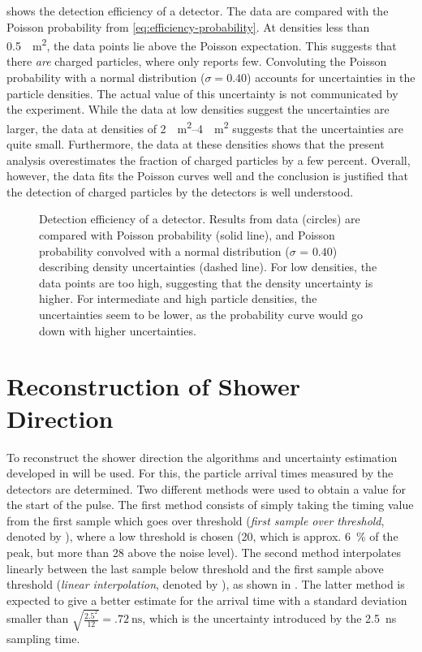 shows the detection efficiency
of a \hisparc detector.  The data are compared with the Poisson probability from
\eqref{eq:efficiency-probability}.  At densities less than
\SI{0.5}{\per\square\meter}, the data points lie above the Poisson expectation.
This suggests that there \emph{are} charged particles, where \kascade only reports few.
Convoluting the Poisson probability with a normal distribution ($\sigma =
\num{0.40}$) accounts for uncertainties in the \kascade particle
densities.  The actual value of this uncertainty is not communicated by
the \kascade experiment.
While the data at low densities suggest the uncertainties are larger, the data
at densities of \SIrange{2}{4}{\per\square\meter} suggests that the
uncertainties are quite small.  Furthermore, the data at these densities
shows that the present analysis overestimates the fraction of charged particles
by a few percent. Overall, however, the data fits the Poisson curves well and
the conclusion is justified that the detection of charged particles by the
\hisparc detectors is well understood.

\begin{figure}
\centering

\caption{Detection efficiency of a \hisparc detector.  Results from data
(circles) are compared with Poisson probability (solid line), and Poisson
probability convolved with a normal distribution ($\sigma$ = $\num{0.40}$)
describing \kascade density uncertainties (dashed line).  For low
densities, the data points are too high, suggesting that the density
uncertainty is higher.  For intermediate and high particle densities, the
uncertainties seem to be lower, as the probability curve would go down
with higher uncertainties.}
\label{fig:detection-efficiency}
\end{figure}


\section{Reconstruction of Shower Direction}
\label{sec:kascade-reconstruction}

To reconstruct the shower direction the algorithms and uncertainty estimation
developed in  will be used.
For this, the particle arrival times measured by the detectors are determined.
Two different methods were used to obtain a value for the start of the pulse.
The first method consists of simply taking the timing value from the first
sample which goes over threshold (\emph{first sample over threshold}, denoted by
), where a low threshold is chosen (\SI{20}{\adc}, which is
approx. \SI{6}{\percent} of the  peak, but more than
\SI{28}{\unitsigma} above the noise level).  The second method interpolates
linearly between the last sample below threshold and the first sample above
threshold (\emph{linear interpolation}, denoted by ), as shown
in .  The latter method is expected to give a better
estimate for the arrival time with a standard deviation smaller than
$\sqrt{\frac{2.5^2}{12}} = \SI{.72}{\nano\second}$, which is the uncertainty
introduced by the \SI{2.5}{\nano\second} sampling time.

